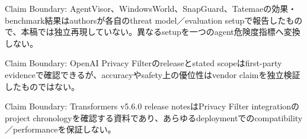 \begin{claimboundary}
Claim Boundary: AgentVisor、WindowsWorld、SnapGuard、Tatemaeの効果・benchmark結果はauthorsが各自のthreat model／evaluation setupで報告したもので、本稿では独立再現していない。異なるsetupを一つのagent危険度指標へ変換しない。\autocite{src-477d406be59c,src-73ae4b975e7b,src-8cf1b0dc8361,src-a408165af133}
\end{claimboundary}

\begin{claimboundary}
Claim Boundary: OpenAI Privacy Filterのreleaseとstated scopeはfirst-party evidenceで確認できるが、accuracyやsafety上の優位性はvendor claimを独立検証したものではない。\autocite{src-3efc4342b784}
\end{claimboundary}

\begin{claimboundary}
Claim Boundary: Transformers v5.6.0 release notesはPrivacy Filter integrationのproject chronologyを確認する資料であり、あらゆるdeploymentでのcompatibility／performanceを保証しない。\autocite{src-2f8952da2dc3}
\end{claimboundary}

